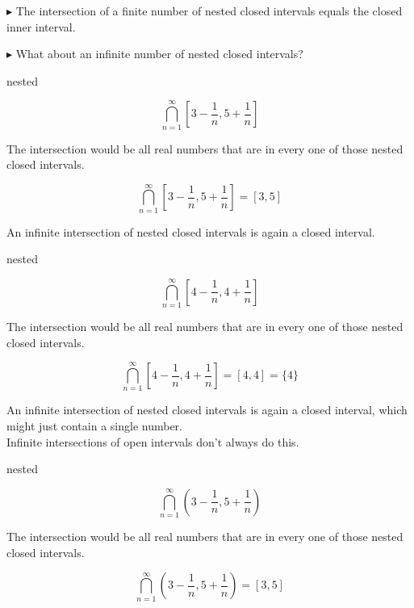 \documentclass{ximera}
\begin{document}
$\blacktriangleright$  The intersection of a finite number of nested closed intervals equals the closed inner interval.

$\blacktriangleright$ What about an infinite number of nested closed intervals?



\begin{example} nested


\[ \bigcap_{n=1}^{\infty}   \left[3 - \frac{1}{n}, 5 + \frac{1}{n}\right]     \]



The intersection would be all real numbers that are in every one of those nested closed intervals.


\[ \bigcap_{n=1}^{\infty}   \left[3 - \frac{1}{n}, 5 + \frac{1}{n}\right]  = [3, 5]   \]





\end{example} 


An infinite intersection of nested closed intervals is again a closed interval. \\






\begin{example} nested


\[ \bigcap_{n=1}^{\infty}   \left[4 - \frac{1}{n}, 4 +  \frac{1}{n}\right]     \]



The intersection would be all real numbers that are in every one of those nested closed intervals.


\[ \bigcap_{n=1}^{\infty}   \left[4 -  \frac{1}{n}, 4 + \frac{1}{n}\right]    = [4, 4] = \{ 4 \}  \]





\end{example}


An infinite intersection of nested closed intervals is again a closed interval, which might just contain a single number. \\





Infinite intersections of open intervals don't always do this.


\begin{example} nested


\[ \bigcap_{n=1}^{\infty}   \left(3 - \frac{1}{n}, 5 + \frac{1}{n}\right)     \]



The intersection would be all real numbers that are in every one of those nested closed intervals.


\[ \bigcap_{n=1}^{\infty}   \left(3 - \frac{1}{n}, 5 + \frac{1}{n}\right)  = [3, 5]   \]





\end{example}
\end{document}
